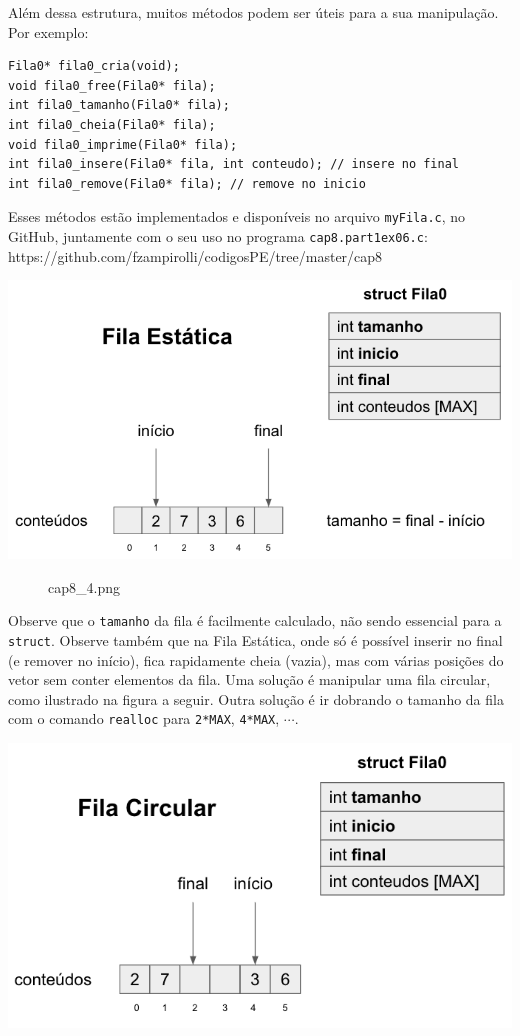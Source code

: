 \documentclass[12pt,a4paper]{article}
\begin{document}
Além dessa estrutura, muitos métodos podem ser úteis para a sua
manipulação. Por exemplo:

\begin{verbatim}
Fila0* fila0_cria(void);
void fila0_free(Fila0* fila);
int fila0_tamanho(Fila0* fila);
int fila0_cheia(Fila0* fila);
void fila0_imprime(Fila0* fila);
int fila0_insere(Fila0* fila, int conteudo); // insere no final
int fila0_remove(Fila0* fila); // remove no inicio
\end{verbatim}

Esses métodos estão implementados e disponíveis no arquivo
\texttt{myFila.c}, no GitHub, juntamente com o seu uso no programa
\texttt{cap8.part1ex06.c}:
https://github.com/fzampirolli/codigosPE/tree/master/cap8

\includegraphics{"figs/cap8_4.png"}

    \begin{figure}
\centering
\caption{cap8\_4.png}
\end{figure}

    Observe que o \texttt{tamanho} da fila é facilmente calculado, não sendo
essencial para a \texttt{struct}. Observe também que na Fila Estática,
onde só é possível inserir no final (e remover no início), fica
rapidamente cheia (vazia), mas com várias posições do vetor sem conter
elementos da fila. Uma solução é manipular uma fila circular, como
ilustrado na figura a seguir. Outra solução é ir dobrando o tamanho da
fila com o comando \texttt{realloc} para \texttt{2*MAX}, \texttt{4*MAX},
\(\cdots\).

\includegraphics{"figs/cap8_5.png"}
\end{document}
